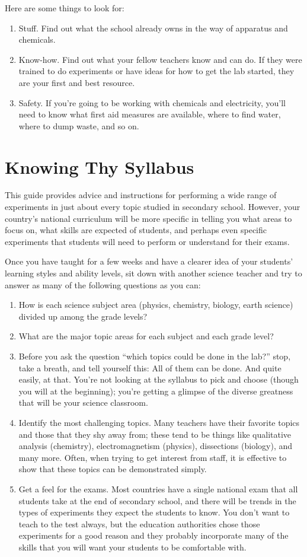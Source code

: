 Here are some things to look for:
\begin{enumerate}
\item{Stuff.  Find out what the school already owns in the way of apparatus and chemicals.}
\item{Know-how.  Find out what your fellow teachers know and can do.  If they were trained to do experiments or have ideas for how to get the lab started, they are your first and best resource.}
\item{Safety.  If you’re going to be working with chemicals and electricity, you’ll need to know what first aid measures are available, where to find water, where to dump waste, and so on.}
\end{enumerate}

\section{Knowing Thy Syllabus}
This guide provides advice and instructions for performing a wide range of experiments in just about every topic studied in secondary school.  However, your country’s national curriculum will be more specific in telling you what areas to focus on, what skills are expected of students, and perhaps even specific experiments that students will need to perform or understand for their exams.

Once you have taught for a few weeks and have a clearer idea of your students’ learning styles and ability levels, sit down with another science teacher and try to answer as many of the following questions as you can:
\begin{enumerate}
\item{How is each science subject area (physics, chemistry, biology, earth science) divided up among the grade levels?}
\item{What are the major topic areas for each subject and each grade level?}
\item{Before you ask the question “which topics could be done in the lab?” stop, take a breath, and tell yourself this:  All of them can be done.  And quite easily, at that.  You’re not looking at the syllabus to pick and choose (though you will at the beginning); you’re getting a glimpse of the diverse greatness that will be your science classroom.}
\item{Identify the most challenging topics.  Many teachers have their favorite topics and those that they shy away from; these tend to be things like qualitative analysis (chemistry), electromagnetism (physics), dissections (biology), and many more.  Often, when trying to get interest from staff, it is effective to show that these topics can be demonstrated simply.}
\item{Get a feel for the exams.  Most countries have a single national exam that all students take at the end of secondary school, and there will be trends in the types of experiments they expect the students to know. You don’t want to teach to the test always, but the education authorities chose those experiments for a good reason and they probably incorporate many of the skills that you will want your students to be comfortable with.}
\end{enumerate}

